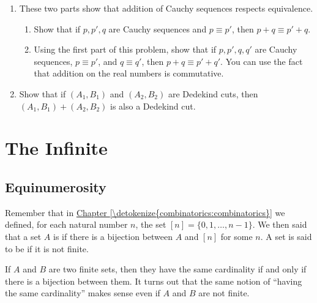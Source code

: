 \documentclass[letterpaper,10pt,english]{sphinxmanual}
\begin{document}
\begin{enumerate}
\begin{enumerate}
\end{enumerate}

\item {} 
\sphinxAtStartPar
These two parts show that addition of Cauchy sequences respects equivalence.
\begin{enumerate}
%
\item {} 
\sphinxAtStartPar
Show that if \(p, p', q\) are Cauchy sequences and \(p \equiv p'\), then \(p + q \equiv p' + q\).

\item {} 
\sphinxAtStartPar
Using the first part of this problem, show that if \(p, p', q, q'\) are Cauchy sequences, \(p \equiv p'\), and \(q \equiv q'\), then \(p + q \equiv p' + q'\). You can use the fact that addition on the real numbers is commutative.

\end{enumerate}

\item {} 
\sphinxAtStartPar
Show that if \((A_1, B_1)\) and \((A_2, B_2)\) are Dedekind cuts, then \((A_1, B_1) + (A_2, B_2)\) is also a Dedekind cut.

\end{enumerate}


\chapter{The Infinite}
\label{\detokenize{the_infinite:the-infinite}}\label{\detokenize{the_infinite::doc}}

\section{Equinumerosity}
\label{\detokenize{the_infinite:equinumerosity}}
\sphinxAtStartPar
Remember that in \hyperref[\detokenize{combinatorics:combinatorics}]{Chapter \ref{\detokenize{combinatorics:combinatorics}}} we defined, for each natural number \(n\), the set \([n] = \{0, 1, \ldots, n-1\}\).  We then said that a set \(A\) is  if there is a bijection between \(A\) and \([n]\) for some \(n\). A set is said to be  if it is not finite.

\sphinxAtStartPar
If \(A\) and \(B\) are two finite sets, then they have the same cardinality if and only if there is a bijection between them. It turns out that the same notion of “having the same cardinality” makes sense even if \(A\) and \(B\) are not finite.
\end{document}
